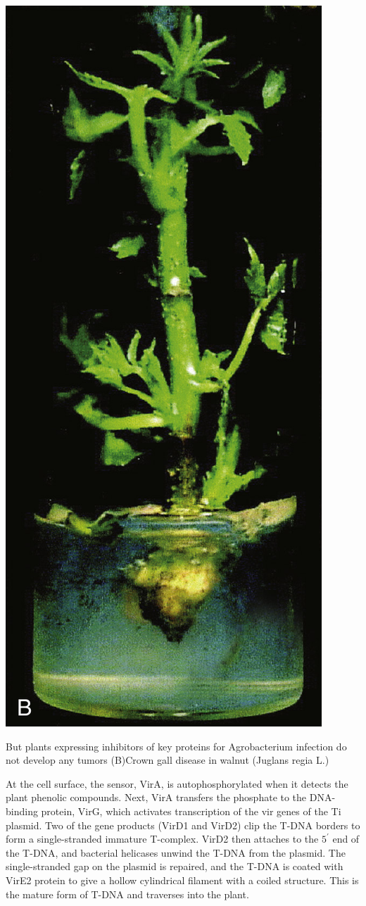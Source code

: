 \documentclass[nofonts,]{tufte-handout}
\begin{document}
\begin{marginfigure}
\includegraphics[width=0.7\linewidth]{./images/agrobacterium_gall_b} \caption[But plants expressing inhibitors of key proteins for Agrobacterium infection do not develop any tumors (B)\newline Crown gall disease in walnut (Juglans regia L.)]{But plants expressing inhibitors of key proteins for Agrobacterium infection do not develop any tumors (B)\newline Crown gall disease in walnut (Juglans regia L.)}\label{fig:agrobacterium-gall}
\end{marginfigure}

At the cell surface, the sensor, VirA, is autophosphorylated when it
detects the plant phenolic compounds. Next, VirA transfers the phosphate
to the DNA-binding protein, VirG, which activates transcription of the
vir genes of the Ti plasmid. Two of the gene products (VirD1 and VirD2)
clip the T-DNA borders to form a single-stranded immature T-complex.
VirD2 then attaches to the \(5^\prime\) end of the T-DNA, and bacterial
helicases unwind the T-DNA from the plasmid. The single-stranded gap on
the plasmid is repaired, and the T-DNA is coated with VirE2 protein to
give a hollow cylindrical filament with a coiled structure. This is the
mature form of T-DNA and traverses into the plant.
\end{document}
